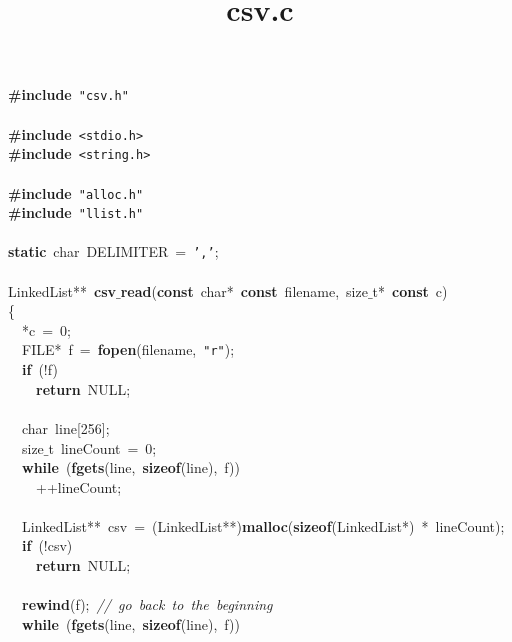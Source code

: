 \documentclass{article}
\title{csv.c}
\date{}
\begin{document}
\maketitle

\noindent
\mbox{}\textbf{\#include}\ \texttt{"{}csv.h"{}} \\
\mbox{} \\
\mbox{}\textbf{\#include}\ \texttt{\textless{}stdio.h\textgreater{}} \\
\mbox{}\textbf{\#include}\ \texttt{\textless{}string.h\textgreater{}} \\
\mbox{} \\
\mbox{}\textbf{\#include}\ \texttt{"{}alloc.h"{}} \\
\mbox{}\textbf{\#include}\ \texttt{"{}llist.h"{}} \\
\mbox{} \\
\mbox{}\textbf{static}\ char\ DELIMITER\ =\ \texttt{','}; \\
\mbox{} \\
\mbox{}LinkedList**\ \textbf{csv$\_$read}(\textbf{const}\ char*\ \textbf{const}\ filename,\ size$\_$t*\ \textbf{const}\ c) \\
\mbox{}\{ \\
\mbox{}\ \ *c\ =\ 0; \\
\mbox{}\ \ FILE*\ f\ =\ \textbf{fopen}(filename,\ \texttt{"{}r"{}}); \\
\mbox{}\ \ \textbf{if}\ (!f) \\
\mbox{}\ \ \ \ \textbf{return}\ NULL; \\
\mbox{} \\
\mbox{}\ \ char\ line[256]; \\
\mbox{}\ \ size$\_$t\ lineCount\ =\ 0; \\
\mbox{}\ \ \textbf{while}\ (\textbf{fgets}(line,\ \textbf{sizeof}(line),\ f)) \\
\mbox{}\ \ \ \ ++lineCount; \\
\mbox{} \\
\mbox{}\ \ LinkedList**\ csv\ =\ (LinkedList**)\textbf{malloc}(\textbf{sizeof}(LinkedList*)\ *\ lineCount); \\
\mbox{}\ \ \textbf{if}\ (!csv) \\
\mbox{}\ \ \ \ \textbf{return}\ NULL; \\
\mbox{} \\
\mbox{}\ \ \textbf{rewind}(f);\ \textit{//\ go\ back\ to\ the\ beginning} \\
\mbox{}\ \ \textbf{while}\ (\textbf{fgets}(line,\ \textbf{sizeof}(line),\ f)) \\
\end{document}
